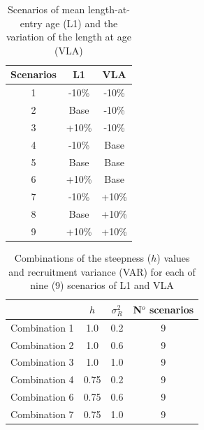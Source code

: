 \documentclass[11pt,letterpaper,]{article}
\begin{document}
\begin{table}[ht]
\centering
\caption{Scenarios of mean length-at-entry age (L1) and the variation of the length at age (VLA) \vspace{0.5cm}}
\label{table1}
\begin{tabular}{c|c|c} \hline
\rowcolor[HTML]{EFEFEF} 
\textbf{Scenarios} & \textbf{L1} & \textbf{VLA} \\ \hline
1                  & -10\%       & -10\%        \\
2                  & Base        & -10\%        \\
3                  & +10\%       & -10\%        \\
4                  & -10\%       & Base         \\
5                  & Base        & Base         \\
6                  & +10\%       & Base         \\
7                  & -10\%       & +10\%        \\
8                  & Base        & +10\%        \\
9                  & +10\%       & +10\%       \\ \hline
\end{tabular}
\end{table}


\begin{table}[h]
\centering
\caption{Combinations of the steepness ($h$) values and recruitment variance (VAR) for each of nine (9) scenarios of L1 and VLA \vspace{0.5cm}}
\label{table2}
\begin{tabular}{c|c|c|c} \hline
\rowcolor[HTML]{EFEFEF} 
              & \textbf{$h$}    & \textbf{$\sigma^2_R$} & \textbf{N$^o$ scenarios} \\ \hline
Combination 1 & 1.0  & 0.2    & 9           \\
Combination 2 & 1.0  & 0.6    & 9           \\
Combination 3 & 1.0  & 1.0    & 9           \\
Combination 4 & 0.75 & 0.2    & 9           \\
Combination 6 & 0.75 & 0.6    & 9           \\
Combination 7 & 0.75 & 1.0    & 9          \\ \hline
\end{tabular}
\end{table}
\end{document}
